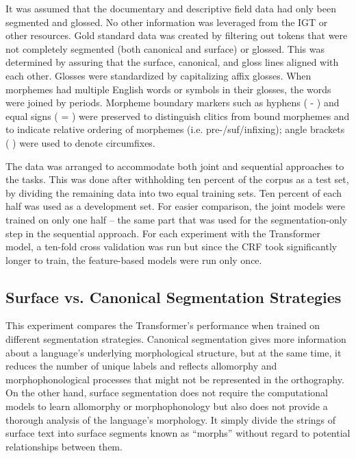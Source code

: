 It was assumed that the documentary and descriptive field data had only been segmented and glossed. No other information was leveraged from the IGT or other resources. Gold standard data was created by filtering out tokens that were not completely segmented (both canonical and surface) or glossed. This was determined by assuring that the surface, canonical, and gloss lines aligned with each other. 
Glosses were standardized by capitalizing affix glosses. When morphemes had multiple English words or symbols in their glosses, the words were joined by periods.
Morpheme boundary markers such as hyphens ( - ) and equal signs ( = ) were preserved to distinguish clitics from bound morphemes and to indicate relative ordering of morphemes (i.e. pre-/suf/infixing); angle brackets ( \textlangle{}\textrangle{} ) were used to denote circumfixes. 

The data was arranged to accommodate both joint and sequential approaches to the tasks. This was done after withholding ten percent of the corpus as a test set, by dividing the remaining data into two equal training sets. Ten percent of each half was used as a development set. For easier comparison, the joint models were trained on only one half -- the same part that was used for the segmentation-only step in the sequential approach. For each experiment with the Transformer model, a ten-fold cross validation was run but since the CRF took significantly longer to train, the feature-based models were run only once.


\subsection{Surface vs. Canonical Segmentation Strategies}
\label{sec:sgstrategies}

This experiment compares the Transformer's performance when trained on different segmentation strategies. Canonical segmentation gives more information about a language's underlying morphological structure, but at the same time, it reduces the number of unique labels and reflects allomorphy and morphophonological processes that might not be represented in the orthography. On the other hand, surface segmentation does not require the computational models to learn allomorphy or morphophonology \citep{goldsmith_computational_2017} but also does not provide a thorough analysis of the language's morphology. It simply divide the strings of surface text into surface segments known as ``morphs'' without regard to potential relationships between them. 


